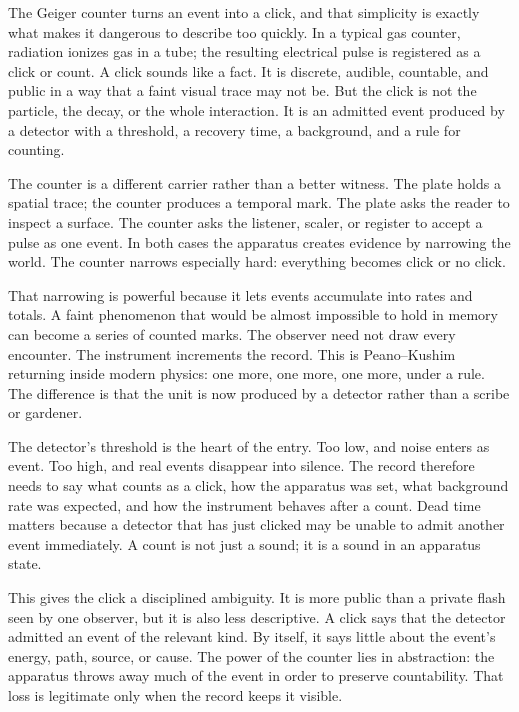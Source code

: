 The Geiger counter turns an event into a click, and that simplicity is
exactly what makes it dangerous to describe too quickly. In a typical gas
counter, radiation ionizes gas in a tube; the resulting electrical pulse is
registered as a click or count. A click sounds like a fact. It is discrete,
audible, countable, and public in a way that a faint visual trace may not
be. But the click is not the particle, the decay, or the whole interaction.
It is an admitted event produced by a detector with a threshold, a recovery
time, a background, and a rule for counting.

The counter is a different carrier rather than a better witness. The plate
holds a spatial trace; the counter produces a temporal mark. The plate asks the
reader to inspect a surface. The counter asks the listener, scaler, or register
to accept a pulse as one event. In both cases the apparatus creates evidence by
narrowing the world. The counter narrows especially hard: everything becomes
click or no click.

That narrowing is powerful because it lets events accumulate into rates and
totals. A faint phenomenon that would be almost impossible to hold in memory
can become a series of counted marks. The observer need not draw every
encounter. The instrument increments the record. This is Peano--Kushim
returning inside modern physics: one more, one more, one more, under a rule.
The difference is that the unit is now produced by a detector rather than a
scribe or gardener.

The detector's threshold is the heart of the entry. Too low, and noise enters
as event. Too high, and real events disappear into silence. The record therefore
needs to say what counts as a click, how the apparatus was set, what
background rate was expected, and how the instrument behaves after a count.
Dead time matters because a detector that has just clicked may be unable to
admit another event immediately. A count is not just a sound; it is a sound in
an apparatus state.

This gives the click a disciplined ambiguity. It is more public than a private
flash seen by one observer, but it is also less descriptive. A click says that
the detector admitted an event of the relevant kind. By itself, it says
little about the event's energy, path, source, or cause. The power of the
counter lies in abstraction: the apparatus throws away much of the event in
order to preserve countability. That loss is legitimate only when the record
keeps it visible.

